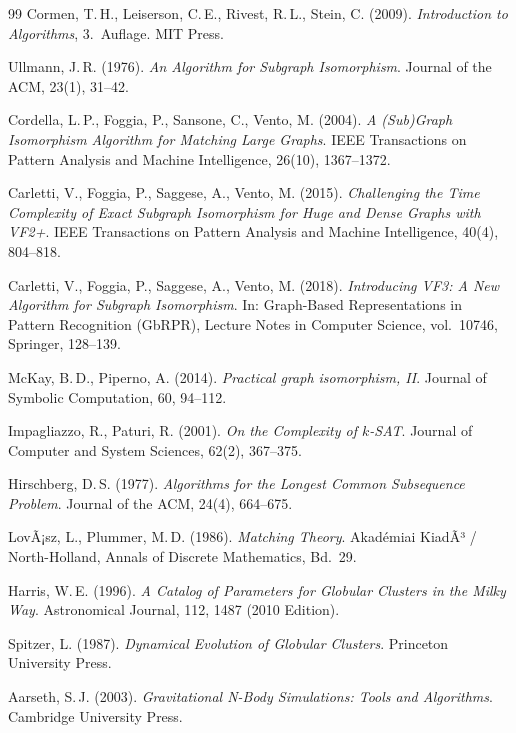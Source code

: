 ﻿\documentclass[a4paper,12pt]{report}
\theoremstyle{definition}
\begin{document}
\begin{thebibliography}{99}
Cormen, T.\,H., Leiserson, C.\,E., Rivest, R.\,L., Stein, C. (2009). \textit{Introduction to Algorithms}, 3.\ Auflage. MIT Press.

Ullmann, J.\,R. (1976). \textit{An Algorithm for Subgraph Isomorphism}. Journal of the ACM, 23(1), 31--42.

Cordella, L.\,P., Foggia, P., Sansone, C., Vento, M. (2004). \textit{A (Sub)Graph Isomorphism Algorithm for Matching Large Graphs}. IEEE Transactions on Pattern Analysis and Machine Intelligence, 26(10), 1367--1372.

Carletti, V., Foggia, P., Saggese, A., Vento, M. (2015). \textit{Challenging the Time Complexity of Exact Subgraph Isomorphism for Huge and Dense Graphs with VF2+}. IEEE Transactions on Pattern Analysis and Machine Intelligence, 40(4), 804--818.

Carletti, V., Foggia, P., Saggese, A., Vento, M. (2018). \textit{Introducing VF3: A New Algorithm for Subgraph Isomorphism}. In: Graph-Based Representations in Pattern Recognition (GbRPR), Lecture Notes in Computer Science, vol.~10746, Springer, 128--139.

McKay, B.\,D., Piperno, A. (2014). \textit{Practical graph isomorphism, II}. Journal of Symbolic Computation, 60, 94--112.

Impagliazzo, R., Paturi, R. (2001). \textit{On the Complexity of $k$-SAT}. Journal of Computer and System Sciences, 62(2), 367--375.

Hirschberg, D.\,S. (1977). \textit{Algorithms for the Longest Common Subsequence Problem}. Journal of the ACM, 24(4), 664--675.

LovÃ¡sz, L., Plummer, M.\,D. (1986). \textit{Matching Theory}. Akadémiai KiadÃ³ / North-Holland, Annals of Discrete Mathematics, Bd.~29.


Harris, W.\,E. (1996). \textit{A Catalog of Parameters for Globular Clusters in the Milky Way}. Astronomical Journal, 112, 1487 (2010 Edition).

Spitzer, L. (1987). \textit{Dynamical Evolution of Globular Clusters}. Princeton University Press.

Aarseth, S.\,J. (2003). \textit{Gravitational N-Body Simulations: Tools and Algorithms}. Cambridge University Press.


\end{thebibliography}
\end{document}
